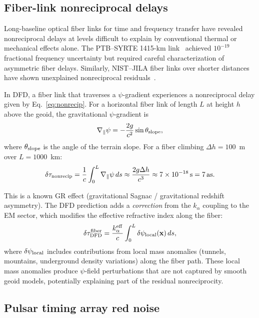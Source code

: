 \documentclass[aps,prd,twocolumn,superscriptaddress,nofootinbib]{revtex4-2}
\newcommand{\as}{\,\mathrm{as}}
\begin{document}
\subsection{Fiber-link nonreciprocal delays}\label{sec:fiber-anomalies}

Long-baseline optical fiber links for time and frequency transfer have
revealed nonreciprocal delays at levels difficult to explain by
conventional thermal or mechanical effects alone. The PTB--SYRTE
1415-km link~\cite{Lisdat2016} achieved $10^{-19}$ fractional
frequency uncertainty but required careful characterization of
asymmetric fiber delays. Similarly, NIST--JILA fiber links over
shorter distances have shown unexplained nonreciprocal
residuals~\cite{Sinclair2019}.

In DFD, a fiber link that traverses a $\psi$-gradient experiences
a nonreciprocal delay given by Eq.~\eqref{eq:nonrecip}. For a
horizontal fiber link of length $L$ at height $h$ above the geoid,
the gravitational $\psi$-gradient is
\begin{equation}
\nabla_\parallel\psi = -\frac{2g}{c^2}\sin\theta_{\rm slope},
\end{equation}
where $\theta_{\rm slope}$ is the angle of the terrain slope. For a
fiber climbing $\Delta h = 100$~m over $L = 1000$~km:
\begin{equation}
\delta\tau_{\rm nonrecip} = \frac{1}{c}\int_0^L \nabla_\parallel\psi\,ds
\approx \frac{2g\Delta h}{c^3} \approx 7\times10^{-18}\,\mathrm{s} = 7\as.
\end{equation}

This is a known GR effect (gravitational Sagnac / gravitational
redshift asymmetry). The DFD prediction adds a \emph{correction} from the
$k_\alpha$ coupling to the EM sector, which modifies the effective
refractive index along the fiber:
\begin{equation}\label{eq:fiber-DFD}
\delta\tau_{\rm DFD}^{\rm fiber} = \frac{k_\alpha^{\rm eff}}{c}\int_0^L
\delta\psi_{\rm local}(\mathbf{x})\,ds,
\end{equation}
where $\delta\psi_{\rm local}$ includes contributions from local
mass anomalies (tunnels, mountains, underground density variations)
along the fiber path. These local mass anomalies produce
$\psi$-field perturbations that are not captured by smooth geoid
models, potentially explaining part of the residual nonreciprocity.

\subsection{Pulsar timing array red noise}\label{sec:PTA}
\end{document}
